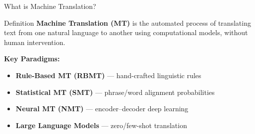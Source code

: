 \documentclass{beamer}
\begin{document}
\begin{frame}{What is Machine Translation?}
      \begin{block}{Definition}
        \textbf{Machine Translation (MT)} is the automated process of translating text from one natural language to another using computational models, without human intervention.
      \end{block}
      \vspace{0.3cm}
      \textbf{Key Paradigms:}
      \begin{itemize}
        \item \textbf{Rule-Based MT (RBMT)} — hand-crafted linguistic rules
        \item \textbf{Statistical MT (SMT)} — phrase/word alignment probabilities
        \item \textbf{Neural MT (NMT)} — encoder–decoder deep learning
        \item \textbf{Large Language Models} — zero/few-shot translation
      \end{itemize}
\end{frame}
\end{document}
